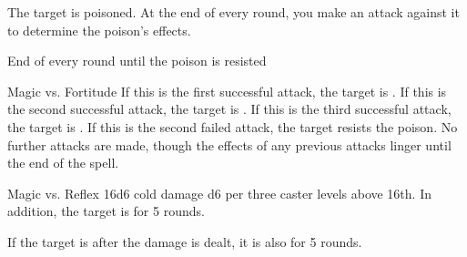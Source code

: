 \begin{spellheader}
    \spellrng{\rngclose}
\end{spellheader}
\begin{spelleffects}
    \spelleffect The target is poisoned. At the end of every round, you make an attack against it to determine the poison's effects.
    \begin{spelltrigger}{End of every round until the poison is resisted}
        \begin{spellattack}{Magic vs. Fortitude}
            \spellsuccess If this is the first successful attack, the target is \sickened. If this is the second successful attack, the target is \staggered. If this is the third successful attack, the target is \paralyzed.
            \spellfailure If this is the second failed attack, the target resists the poison. No further attacks are made, though the effects of any previous attacks linger until the end of the spell.
        \end{spellattack}
    \end{spelltrigger}
\end{spelleffects}
\begin{spellfooter}

\end{spellfooter}

\begin{spellheader}
    \spellrng{\rngclose}
\end{spellheader}
\begin{spelleffects}
    \begin{spellattack}{Magic vs. Reflex}
        \spellsuccess 16d6 cold damage \add d6 per three caster levels above 16th. In addition, the target is \slowed for 5 rounds.

        If the target is \bloodied after the damage is dealt, it is also \paralyzed for 5 rounds.
    \end{spellattack}
\end{spelleffects}
\begin{spellfooter}

\end{spellfooter}


